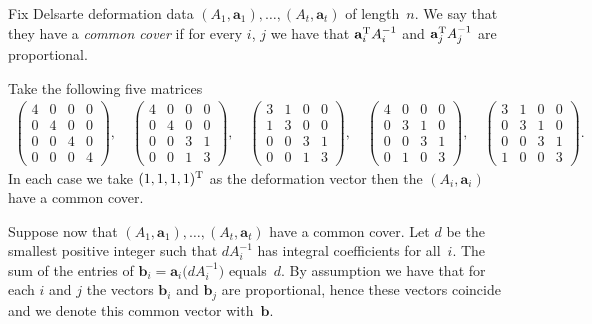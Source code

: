\documentclass[pdftex]{sigma}
\numberwithin{equation}{section}
\begin{document}
\begin{Definition}
Fix Delsarte deformation data $(A_1,\mathbf{a}_1), \dots, (A_t,\mathbf{a}_t)$ of length~$n$. We say that they have a \emph{common cover}
if for every $i$, $j$ we have that $\mathbf{a}^{\rm T}_i A_i^{-1}$ and $\mathbf{a}^{\rm T}_j A_j^{-1}$ are proportional.
\end{Definition}
\begin{Example} Take the following f\/ive matrices
\begin{gather*}
\left(\begin{matrix} 4&0&0&0\\0&4&0&0\\0&0&4&0\\0&0&0&4\end{matrix} \right)\!,\quad
\left(\begin{matrix} 4&0&0&0\\0&4&0&0\\0&0&3&1\\0&0&1&3\end{matrix} \right)\!,\quad
\left(\begin{matrix} 3&1&0&0\\1&3&0&0\\0&0&3&1\\0&0&1&3\end{matrix} \right)\!,\quad
\left(\begin{matrix} 4&0&0&0\\0&3&1&0\\0&0&3&1\\0&1&0&3\end{matrix} \right)\!,\quad
\left(\begin{matrix} 3&1&0&0\\0&3&1&0\\0&0&3&1\\1&0&0&3\end{matrix} \right)\!.
\end{gather*}
In each case we take $(1,1,1,1)^{\rm T}$ as the deformation vector then the $(A_i,\mathbf{a}_i)$ have a common cover.
\end{Example}

Suppose now that $(A_1,\mathbf{a}_1),\dots,(A_t,\mathbf{a}_t)$ have a common cover. Let $d$ be the smallest positive integer such that $dA_i^{-1}$ has integral coef\/f\/icients for all~$i$. The sum of the entries of $\mathbf{b}_i=\mathbf{a}_i \big(dA_i^{-1}\big)$ equals~$d$. By assumption we have that for each $i$ and $j$ the vectors $\mathbf{b}_i$ and $\mathbf{b}_j$ are proportional, hence these vectors coincide and we denote this common vector with~$\mathbf{b}$.
\end{document}

